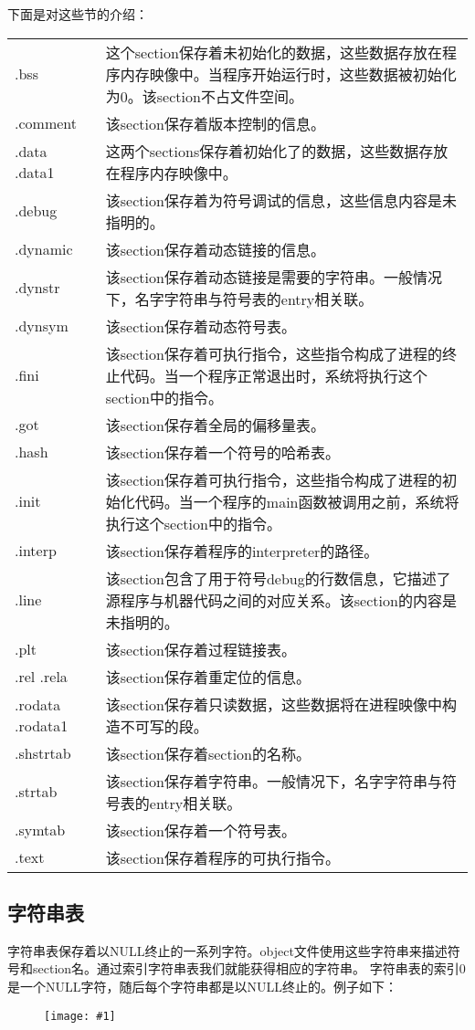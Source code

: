 \documentclass[a4paper,left=2.5cm,right=2.5cm,11pt]{article}
\newcommand{\fic}[1]{\begin{figure}[H]
		\center
		\texttt{[image: \#1]}
	\end{figure}}
\begin{document}
	下面是对这些节的介绍：
	\vspace{0.5em}
	\begin{longtable}{p{1.5cm}p{10cm}}
	.bss & 这个section保存着未初始化的数据，这些数据存放在程序内存映像中。当程序开始运行时，这些数据被初始化为0。该section不占文件空间。 \\
	.comment & 该section保存着版本控制的信息。\\
	.data .data1 & 这两个sections保存着初始化了的数据，这些数据存放在程序内存映像中。\\
	.debug & 该section保存着为符号调试的信息，这些信息内容是未指明的。\\
	.dynamic & 该section保存着动态链接的信息。\\
	.dynstr & 该section保存着动态链接是需要的字符串。一般情况下，名字字符串与符号表的entry相关联。\\
	.dynsym & 该section保存着动态符号表。\\
	.fini & 该section保存着可执行指令，这些指令构成了进程的终止代码。当一个程序正常退出时，系统将执行这个section中的指令。\\
	.got & 该section保存着全局的偏移量表。\\
	.hash & 该section保存着一个符号的哈希表。\\
	.init & 该section保存着可执行指令，这些指令构成了进程的初始化代码。当一个程序的main函数被调用之前，系统将执行这个section中的指令。\\
	.interp & 该section保存着程序的interpreter的路径。\\
	.line & 该section包含了用于符号debug的行数信息，它描述了源程序与机器代码之间的对应关系。该section的内容是未指明的。\\
	.plt & 该section保存着过程链接表。\\
	.rel .rela & 该section保存着重定位的信息。\\
	.rodata .rodata1 & 该section保存着只读数据，这些数据将在进程映像中构造不可写的段。\\
	.shstrtab &  该section保存着section的名称。\\
	.strtab & 该section保存着字符串。一般情况下，名字字符串与符号表的entry相关联。\\
	.symtab & 该section保存着一个符号表。\\
	.text & 该section保存着程序的可执行指令。\\
	\end{longtable}
	\vspace{0.5em}

\subsection{字符串表}
	字符串表保存着以NULL终止的一系列字符。object文件使用这些字符串来描述符号和section名。通过索引字符串表我们就能获得相应的字符串。
	字符串表的索引0是一个NULL字符，随后每个字符串都是以NULL终止的。例子如下：
	\fic{18.png}
\end{document}
